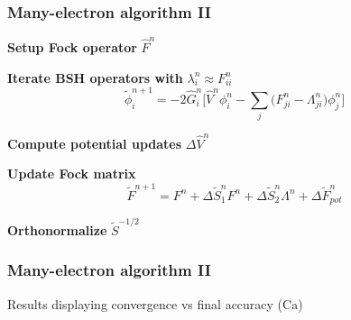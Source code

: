 \begin{frame}
    \frametitle{Many-electron algorithm II}
    \centering
    \textbf{Setup Fock operator} $\hat{F}^n$

    \vspace{8mm}

    \textbf{Iterate BSH operators with} $\lambda_i^n \approx F_{ii}^n$
    \begin{equation}
	\nonumber
        \tilde{\phi}_i^{n+1} = -2\hat{G}_i^n \bigg[\hat{V}^n\phi_i^n -
        \sum_j\big(F_{ji}^n - \Lambda_{ji}^n\big)\phi_j^n\bigg]
    \end{equation}

    \vspace{2mm}

    \textbf{Compute potential updates} $\Delta\hat{V}^n$

    \vspace{8mm}

    \textbf{Update Fock matrix}
    \begin{equation}
        \nonumber
        \tilde{F}^{n+1} = F^{n} + 
        \Delta \tilde{S}_1^n F^n +
        \Delta \tilde{S}_2^n \Lambda^n +
        \Delta \tilde{F}_{pot}^n
    \end{equation}

    \vspace{5mm}

    \textbf{Orthonormalize} $\tilde{S}^{-1/2}$

\end{frame}

\begin{frame}
    \frametitle{Many-electron algorithm II}
    Results displaying convergence vs final accuracy (Ca)
\end{frame}

